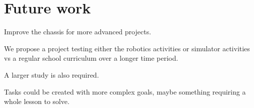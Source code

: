 \section{Future work}
Improve the chassis for more advanced projects.

We propose a project testing either the robotics activities or simulator activities vs a regular school curriculum over a longer time period. 

A larger study is also required. 

Tasks could be created with more complex goals, maybe something requiring a whole lesson to solve. 